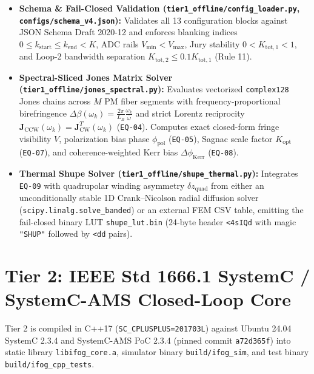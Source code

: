 \documentclass[11pt,a4paper]{article}
\begin{document}
\begin{itemize}
    \item \textbf{Schema \& Fail-Closed Validation (\texttt{tier1\_offline/config\_loader.py}, \texttt{configs/schema\_v4.json}):} Validates all 13 configuration blocks against JSON Schema Draft 2020-12 and enforces blanking indices $0 \le k_{\text{start}} \le k_{\text{end}} < K$, ADC rails $V_{\min} < V_{\max}$, Jury stability $0 < K_{\text{tot},1} < 1$, and Loop-2 bandwidth separation $K_{\text{tot},2} \le 0.1 K_{\text{tot},1}$ (Rule 11).
    \item \textbf{Spectral-Sliced Jones Matrix Solver (\texttt{tier1\_offline/jones\_spectral.py}):} Evaluates vectorized \texttt{complex128} Jones chains across $M$ PM fiber segments with frequency-proportional birefringence $\Delta\beta(\omega_k) = \frac{2\pi}{L_B}\frac{\omega_k}{\bar{\omega}}$ and strict Lorentz reciprocity $\mathbf{J}_{\text{CCW}}(\omega_k) = \mathbf{J}_{\text{CW}}^T(\omega_k)$ (\texttt{EQ-04}). Computes exact closed-form fringe visibility $V$, polarization bias phase $\phi_{\text{pol}}$ (\texttt{EQ-05}), Sagnac scale factor $K_{\text{opt}}$ (\texttt{EQ-07}), and coherence-weighted Kerr bias $\Delta\phi_{\text{Kerr}}$ (\texttt{EQ-08}).
    \item \textbf{Thermal Shupe Solver (\texttt{tier1\_offline/shupe\_thermal.py}):} Integrates \texttt{EQ-09} with quadrupolar winding asymmetry $\delta z_{\text{quad}}$ from either an unconditionally stable 1D Crank--Nicolson radial diffusion solver (\texttt{scipy.linalg.solve\_banded}) or an external FEM CSV table, emitting the fail-closed binary LUT \texttt{shupe\_lut.bin} (24-byte header \texttt{<4sIQd} with magic \texttt{"SHUP"} followed by \texttt{<dd} pairs).
\end{itemize}

\section{Tier 2: IEEE Std 1666.1 SystemC / SystemC-AMS Closed-Loop Core}

Tier 2 is compiled in C++17 (\texttt{SC\_CPLUSPLUS=201703L}) against Ubuntu 24.04 SystemC 2.3.4 and SystemC-AMS PoC 2.3.4 (pinned commit \texttt{a72d365f}) into static library \texttt{libifog\_core.a}, simulator binary \texttt{build/ifog\_sim}, and test binary \texttt{build/ifog\_cpp\_tests}.
\end{document}
